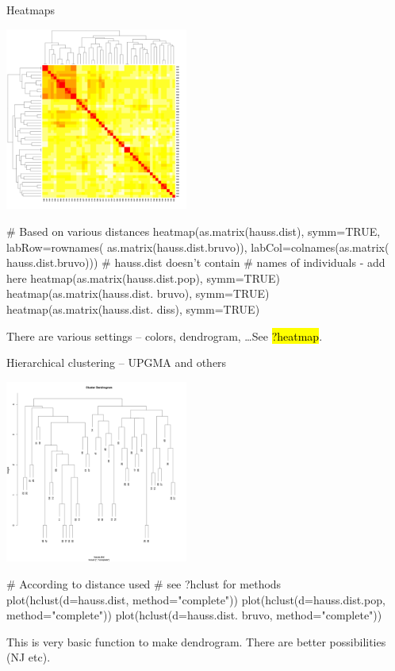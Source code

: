 \documentclass[compress, ucs, xelatex, 11pt, xcolor=svgnames,
  hyperref={
    bookmarks=true,
    unicode=true,
    colorlinks=true,
    pdftitle={Molecular data in R},
    plainpages=false,
    pdfauthor={Vojtech Zeisek},
    pdfsubject={Course about phylogeny and evolution in R},
    pdfcreator={XeLaTeX},
    pdfkeywords={R, evolution, phylogeny, molecular data},
    linkcolor=Tomato,
    anchorcolor=SaddleBrown,
    citecolor=Goldenrod,
    filecolor=DarkMagenta,
    menucolor=Sienna,
    urlcolor=DarkTurquoise,
    pdftex},
  url={hyphens, lowtilde} %
  ]{beamer}
\renewcommand{\texttt}[1]{\hl{\ttfamily #1}}
\begin{document}
\begin{frame}[fragile]{Heatmaps}
\begin{multicols}{2}
  \includegraphics[height=6cm]{heatmap.png}
  \columnbreak
  \begin{spluscode}
    # Based on various distances
    heatmap(as.matrix(hauss.dist),
      symm=TRUE, labRow=rownames(
      as.matrix(hauss.dist.bruvo)),
      labCol=colnames(as.matrix(
      hauss.dist.bruvo)))
      # hauss.dist doesn't contain
      # names of individuals - add here
    heatmap(as.matrix(hauss.dist.pop),
      symm=TRUE)
    heatmap(as.matrix(hauss.dist.
      bruvo), symm=TRUE)
    heatmap(as.matrix(hauss.dist.
      diss), symm=TRUE)
  \end{spluscode}
\end{multicols}
\begin{footnotesize}
  There are various settings -- colors, dendrogram, \ldots See \texttt{?heatmap}.
\end{footnotesize}
\vfil
\end{frame}

\begin{frame}[fragile]{Hierarchical clustering -- UPGMA and others}
\begin{multicols}{2}
  \includegraphics[height=6cm]{hierclust.png}
  \begin{spluscode}
    # According to distance used
    # see ?hclust for methods
    plot(hclust(d=hauss.dist,
      method="complete"))
    plot(hclust(d=hauss.dist.pop,
      method="complete"))
    plot(hclust(d=hauss.dist.
      bruvo, method="complete"))
  \end{spluscode}
  This is very basic function to make dendrogram. There are better possibilities (NJ etc).
\end{multicols}
\end{frame}
\end{document}
